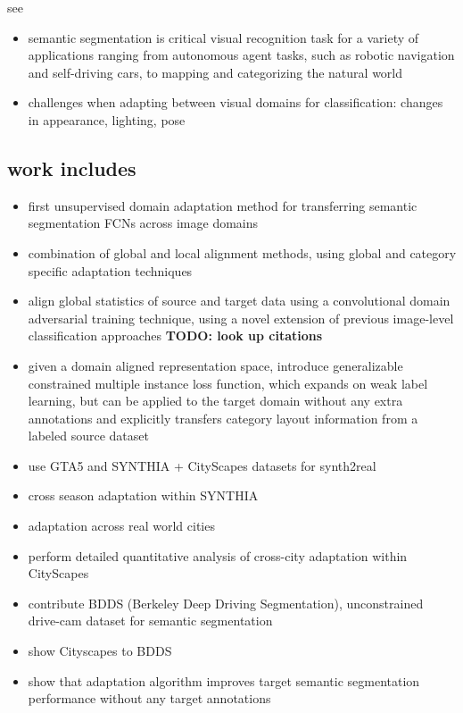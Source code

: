 \documentclass[]{article}
\newcommand{\todo}[1]{{\color{red}\bf{TODO: #1}}}
\begin{document}
see \cite{DBLP:journals/corr/HoffmanWYD16}

\begin{itemize}
	\item semantic segmentation is critical visual recognition task for a variety of applications ranging from autonomous agent tasks, such as robotic navigation and self-driving cars, to mapping and categorizing the natural world
	\item challenges when adapting between visual domains for classification: changes in appearance, lighting, pose
\end{itemize}


\subsection{work includes}
\begin{itemize}
	\item first unsupervised domain adaptation method for transferring semantic segmentation FCNs across image domains
	\item combination of global and local alignment methods, using global and category specific adaptation techniques
	\item align global statistics of source and target data using a convolutional domain adversarial training technique, using a novel extension of previous image-level classification approaches \todo{look up citations}
	\item given a domain aligned representation space, introduce generalizable constrained multiple instance loss function, which expands on weak label learning, but can be applied to the target domain without any extra annotations and explicitly transfers category layout information from a labeled source dataset
	\item use GTA5 and SYNTHIA + CityScapes datasets for synth2real
	\item cross season adaptation within SYNTHIA
	\item adaptation across real world cities
	\item perform detailed quantitative analysis of cross-city adaptation within CityScapes
	\item contribute BDDS (Berkeley Deep Driving Segmentation), unconstrained drive-cam dataset for semantic segmentation
	\item show Cityscapes to BDDS
	\item show that adaptation algorithm improves target semantic segmentation performance without any target annotations
\end{itemize}
\end{document}
